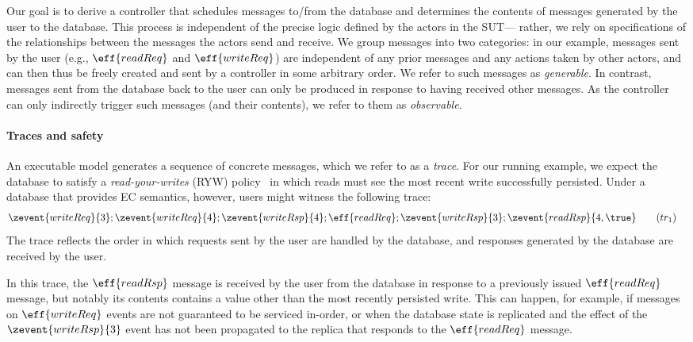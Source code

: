 Our goal is to derive a controller that schedules messages to/from the
database and determines the contents of messages generated by the user
to the database.  This process is independent of the precise
logic defined by the actors in the SUT--- rather, we rely on
specifications of the relationships between the messages the actors
send and receive. We group messages into two categories: in our
example, messages sent by the user (e.g., $\eff{readReq}$ and
$\eff{writeReq}$) are independent of any prior messages and any
actions taken by other actors, and can then thus be freely created and
sent by a controller in some arbitrary order. We refer to such
messages as \emph{generable}. In contrast, messages sent from the
database back to the user can only be produced in response to having
received other messages. As the controller can only indirectly trigger
such messages (and their contents), we refer to them as
\emph{observable}.

\paragraph{Traces and safety}
An executable model generates a sequence of concrete messages, which
we refer to as a \emph{trace}.  For our running example, we expect the
database to satisfy a \emph{read-your-writes} (RYW)
policy~\cite{Session} in which reads must see the most recent write
successfully persisted.  Under a database that provides EC semantics,
however, users might witness the following trace: {\small
  \begin{align}
    &\zevent{writeReq}{3};\zevent{writeReq}{4};\zevent{writeRsp}{4};\eff{readReq};\zevent{writeRsp}{3};\zevent{readRsp}{4,\true}
      \label{eqn:traceEx}\tag{$tr_1$}
  \end{align}}\noindent
The trace reflects the order in which requests sent by
the user are handled by the database, and responses generated by
the database are received by the user.

In this trace, the $\eff{readRsp}$ message is received by the user
from the database in response to a previously issued $\eff{readReq}$
message, but notably its contents contains a value other than the most
recently persisted write.  This can happen, for example, if messages
on $\eff{writeReq}$ events are not guaranteed to be serviced in-order,
or when the database state is replicated and the effect of the
$\zevent{writeRsp}{3}$ event has not been propagated to the replica
that responds to the $\eff{readReq}$ message.

